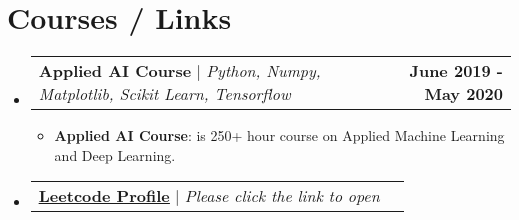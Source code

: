 \documentclass[letterpaper,11pt]{article}
\makeatletter
\newcommand{\resumeItem}[2]{
  \item\small{
    \textbf{#1}{: #2 \vspace{-2pt}}
  }
}
\newcommand{\resumeProjectHeading}[2]{
    \item
    \begin{tabular*}{1.001\textwidth}{l@{\extracolsep{\fill}}r}
      \small#1 & \textbf{\small #2}\\
    \end{tabular*}\vspace{-7pt}
}
\newcommand{\resumeSubHeadingListStart}{\begin{itemize}[leftmargin=0.0in, label={}]}
\newcommand{\resumeSubHeadingListEnd}{\end{itemize}}
\newcommand{\resumeItemListStart}{\begin{itemize}}
\newcommand{\resumeItemListEnd}{\end{itemize}\vspace{-5pt}}
\makeatother
\begin{document}
\section{Courses / Links}
    \resumeSubHeadingListStart
        \resumeProjectHeading
          {\textbf{Applied AI Course} $|$ \emph{Python, Numpy, Matplotlib, Scikit Learn, Tensorflow}}{June 2019 - May 2020}
          \resumeItemListStart
            \resumeItem{Applied AI Course}{is 250+ hour course on Applied Machine Learning and Deep Learning.}
          \resumeItemListEnd
        \resumeProjectHeading
          {\textbf{\href{https://leetcode.com/heyrmi/}{\underline{Leetcode Profile}}} $|$ \emph{Please click the link to open}} {}
      
          
          \vspace{-10pt}
        
    \resumeSubHeadingListEnd
\end{document}
